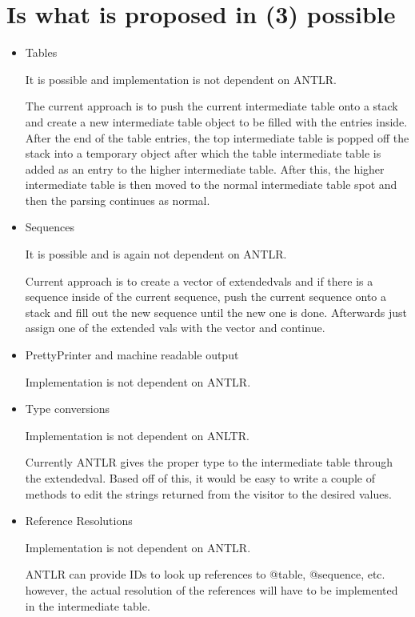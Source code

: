 \documentclass{article}
\begin{document}
\section{Is what is proposed in (3) possible}
\begin{itemize}
  \item Tables
   
    \quad It is possible and implementation is not dependent on ANTLR.

    \quad The current approach is to push the current intermediate table onto a stack and create a new intermediate table object to be filled with the entries inside. After the end of the table entries, the top intermediate table is popped off the stack into a temporary object after which the table intermediate table is added as an entry to the higher intermediate table. After this, the higher intermediate table is then moved to the normal intermediate table spot and then the parsing continues as normal. 

  \item Sequences

    \quad It is possible and is again not dependent on ANTLR.

    \quad Current approach is to create a vector of extendedvals and if there is a sequence inside of the current sequence, push the current sequence onto a stack and fill out the new sequence until the new one is done. Afterwards just assign one of the extended vals with the vector and continue. 

  \item PrettyPrinter and machine readable output

    \quad Implementation is not dependent on ANTLR.

  \item Type conversions

    \quad Implementation is not dependent on ANLTR.

    \quad Currently ANTLR gives the proper type to the intermediate table through the extendedval. Based off of this, it would be easy to write a couple of methods to edit the strings returned from the visitor to the desired values. 

  \item Reference Resolutions

    \quad Implementation is not dependent on ANTLR.

    \quad ANTLR can provide IDs to look up references to @table, @sequence, etc. however, the actual resolution of the references will have to be implemented in the intermediate table.


\end{itemize}
\end{document}

